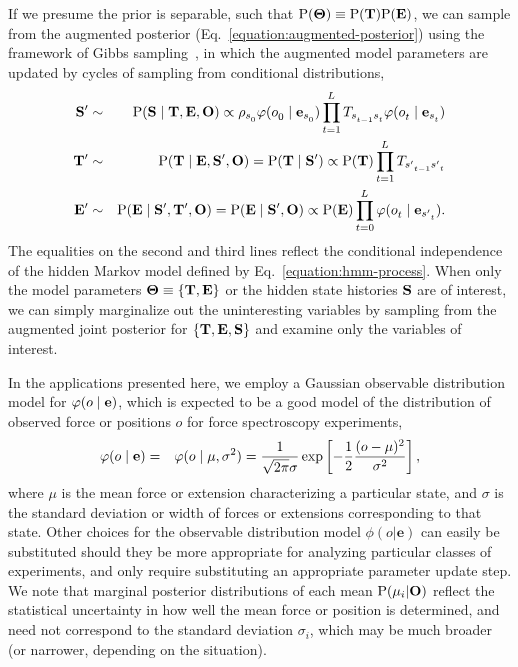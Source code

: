 \documentclass[aps,pre,twocolumn,superscriptaddress,nofootinbib,longbibliography]{revtex4-1}
\newcommand{\bfm}[1]{{\bf #1}}
\renewcommand{\Pr}{\mathrm{P}}
\begin{document}
{If we presume the prior is separable, such that $\Pr(\bfm{\Theta}) \equiv \Pr(\bfm{T}) \Pr(\bfm{E})$, we can sample from the augmented posterior (Eq.~\ref{equation:augmented-posterior}) using the framework of Gibbs sampling~\cite{jun-s-liu:mcmc}, in which the augmented model parameters are updated by cycles of sampling from conditional distributions,
\begin{eqnarray}
\bfm{S}' &\sim& \Pr(\bfm{S} \mid \bfm{T}, \bfm{E}, \bfm{O}) \propto \rho_{s^{}_{0}} \varphi(o^{}_{0} \mid \bfm{e}_{s^{}_{0}}) \prod_{t=1}^{L^{}} T_{s^{}_{t-1} s^{}_{t}} \varphi(o^{}_{t} \mid \bfm{e}_{s^{}_{t}}) \nonumber \\
\bfm{T}' &\sim& \Pr(\bfm{T} \mid \bfm{E}, \bfm{S}', \bfm{O}) = \Pr(\bfm{T} \mid \bfm{S}') \propto \Pr(\bfm{T}) \prod_{t=1}^{L^{}} T_{{s'}^{}_{t-1} {s'}^{}_{t}} \label{equation:conditional-gibbs} \\
\bfm{E}' &\sim& \Pr(\bfm{E} \mid \bfm{S}', \bfm{T}', \bfm{O}) = \Pr(\bfm{E} \mid \bfm{S}', \bfm{O}) \propto \Pr(\bfm{E}) \prod_{t=0}^{L^{}} \varphi(o^{}_{t} \mid \bfm{e}_{{s'}^{}_{t}}) \nonumber .
\end{eqnarray}
The equalities on the second and third lines reflect the conditional independence of the hidden Markov model defined by Eq.~\ref{equation:hmm-process}.
When only the model parameters $\bfm{\Theta} \equiv \{ \bfm{T}, \bfm{E} \}$ or the hidden state histories $\bfm{S}$ are of interest, we can simply marginalize out the uninteresting variables by sampling from the augmented joint posterior for $\{\bfm{T}, \bfm{E}, \bfm{S}\}$ and examine only the variables of interest.

In the applications presented here, we employ a Gaussian observable distribution model for $\varphi(o \mid \bfm{e})$, which is expected to be a good model of the distribution of observed force or positions $o$ for force spectroscopy experiments,
\begin{eqnarray}
\varphi(o \mid \bfm{e}) &=& \varphi(o \mid \mu, \sigma^2) = \frac{1}{\sqrt{2 \pi} \sigma} \exp\left[-\frac{1}{2}\frac{(o - \mu)^2}{\sigma^2} \right] \label{equation:gaussian-observable} ,
\end{eqnarray}
where $\mu$ is the mean force or extension characterizing a particular state, and $\sigma$ is the standard deviation or width of forces or extensions corresponding to that state.
Other choices for the observable distribution model $\phi(o | \mathbf{e})$ can easily be substituted should they be more appropriate for analyzing particular classes of experiments, and only require substituting an appropriate parameter update step.
We note that marginal posterior distributions of each mean $\Pr(\mu_i | \bfm{O})$ reflect the statistical uncertainty in how well the mean force or position is determined, and need not correspond to the standard deviation $\sigma_i$, which may be much broader (or narrower, depending on the situation).

}
\end{document}
